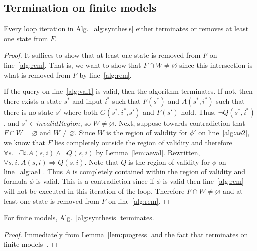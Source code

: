 \subsection{Termination on finite models}
\label{sec:termfinal}
\begin{lemma}
Every loop iteration in Alg.~\ref{alg:synthesis} either
terminates or removes at least one state from $F$.
\label{lem:progress}
\end{lemma}
\begin{proof}
  It suffices to show that at least one state is removed from $F$ on
  line~\ref{alg:rem}. That is, we want to show that $F \cap W \neq \varnothing$ since
  this intersection is what is removed from $F$ by line~\ref{alg:rem}. %
  
  If the query on line~\ref{alg:val1} is valid, then the algorithm terminates.   If not, then there exists a state $s^{*}$ and input $i^{*}$ such that $F(s^{*})$ and $A(s^{*}, i^{*})$ such that there is no state $s'$ where both $G(s^{*}, i^{*}, s')$ and $F(s')$ hold.  Thus, $\lnot Q(s^{*}, i^{*})$, and $s^{*} \in \mathit{invalidRegion}$, so $W \neq \varnothing$.  Next, suppose towards contradiction that $F \cap W = \varnothing$ and $W \neq \varnothing$. Since $W$ is the
  region of validity for $\phi'$ on line~\ref{alg:ae2}, we know that $F$ lies
  completely outside the region of validity and therefore
  $\forall s.~ \neg \exists i. A(s,i) \land \neg Q(s, i)$
  by Lemma~\ref{lem:aeval}. Rewritten,
  $\forall s, i.~ A(s, i) \Rightarrow Q(s, i)$. Note that $Q$ is the
  region of validity for $\phi$ on line~\ref{alg:ae1}. Thus $A$ is completely
  contained within the region of validity and formula $\phi$ is valid.
  This is a contradiction since if $\phi$ is valid then line~\ref{alg:rem} will
  not be executed in this iteration of the loop. Therefore
  $F \cap W \neq \varnothing$ and at least one state is removed from $F$
  on line~\ref{alg:rem}.
\end{proof}

\begin{theorem}
For finite models, Alg.~\ref{alg:synthesis} terminates.
\end{theorem}
\begin{proof}
Immediately from Lemma~\ref{lem:progress} and the fact that \aeval terminates on finite models~\cite{fedyukovich2015automated}.
\end{proof}




